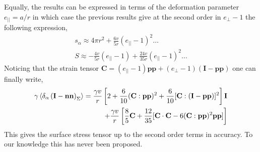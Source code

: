 Equally, the results can be expressed in terms of the deformation parameter $e_{||} = a/r$ in which case the previous results give at the second order in $e_\bot-1$ the following expression, 
\begin{align*}
    s_\alpha 
    \approx 4 \pi r^2 + \frac{6 v }{5 r} (e_{||}-1)^2 \ldots\\
    S 
    \approx 
    - \frac{4 v}{5 r}(e_{||}-1) + \frac{24 v }{35r}(e_{||}-1)^2 \ldots
\end{align*}
Noticing that the strain tensor $\textbf{C} = (e_{||}-1) \textbf{pp} + (e_\bot-1)(\textbf{I}- \textbf{pp})$ one can finally write,
\begin{align*}
    \gamma\left<\delta_\alpha \left( \textbf{I}-\textbf{nn} \right)_\Sigma\right>
    = \frac{\gamma v}{r} \left[
        2  + \frac{6 }{10 } (\textbf{C}:\textbf{pp})^2 + \frac{6 }{10 } [\textbf{C}:(\textbf{I}-\textbf{pp})]^2\right] \textbf{I}\\
        + \frac{\gamma v}{r} \left[ \frac{8}{5} \textbf{C}
        + \frac{12}{35}[\textbf{C}\cdot \textbf{C}- 6 (\textbf{C}:\textbf{pp})^2\textbf{pp}]
        \right]
\end{align*}
This gives the surface stress tensor up to the second order terms in accuracy. 
To our knowledge this has never been proposed. 
